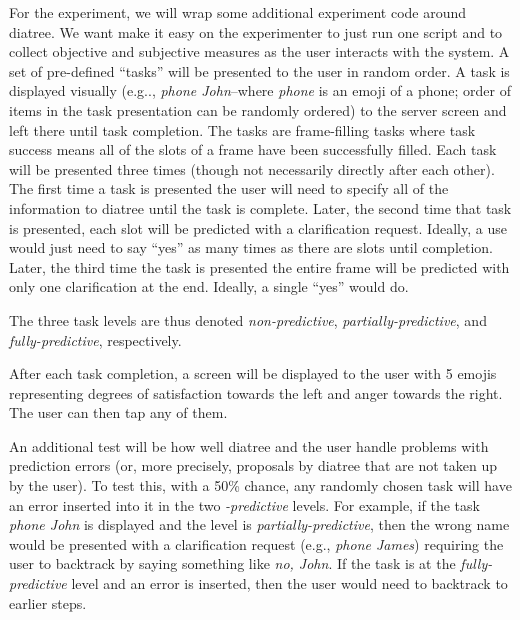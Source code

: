 \documentclass[a4paper,10pt]{article}
\begin{document}
For the experiment, we will wrap some additional experiment code around diatree. We want make it easy on the experimenter to just run one script and to collect objective and subjective measures as the user interacts with the system. A set of pre-defined ``tasks'' will be presented to the user in random order. A task is displayed visually (e.g.., \emph{phone John}--where \emph{phone} is an emoji of a phone; order of items in the task presentation can be randomly ordered) to the server screen and left there until task completion. The tasks are frame-filling tasks where task success means all of the slots of a frame have been successfully filled. Each task will be presented three times (though not necessarily directly after each other). The first time a task is presented the user will need to specify all of the information to diatree until the task is complete. Later, the second time that task is presented, each slot will be predicted with a clarification request. Ideally, a use would just need to say ``yes'' as many times as there are slots until completion. Later, the third time the task is presented the entire frame will be predicted with only one clarification at the end. Ideally, a single ``yes'' would do. 

The three task levels are thus denoted \emph{non-predictive}, \emph{partially-predictive}, and \emph{fully-predictive}, respectively. 

After each task completion, a screen will be displayed to the user with 5 emojis representing degrees of satisfaction towards the left and anger towards the right. The user can then tap any of them. 

An additional test will be how well diatree and the user handle problems with prediction errors (or, more precisely, proposals by diatree that are not taken up by the user). To test this, with a 50\% chance, any randomly chosen task will have an error inserted into it in the two \emph{-predictive} levels. For example, if the task \emph{phone John} is displayed and the level is \emph{partially-predictive}, then the wrong name would be presented with a clarification request (e.g., \emph{phone James}) requiring the user to backtrack by saying something like \emph{no, John}. If the task is at the \emph{fully-predictive} level and an error is inserted, then the user would need to backtrack to earlier steps. 
\end{document}
